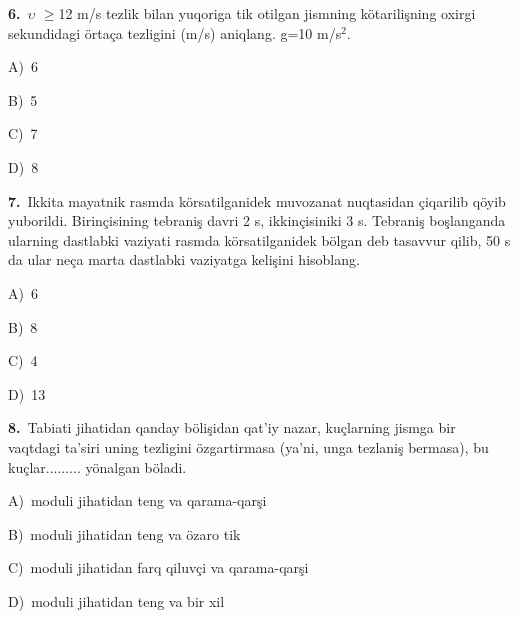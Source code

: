 \documentclass[11pt,a4paper]{article}
\newcommand{\opt}[2]{\hspace*{4mm}#1)\ #2\par}
\begin{document}
\noindent\begin{minipage}{\linewidth}
\textbf{6.}\ $\upsilon$ $\ge$12 m/s tezlik bilan yuqoriga tik otilgan jismning kötarilişning oxirgi sekundidagi örtaça tezligini (m/s) aniqlang. g=10 m/s$^{2}$.\par\smallskip
\opt{A}{6}
\opt{B}{5}
\opt{C}{7}
\opt{D}{8}
\end{minipage}\vspace{9pt}\par
\noindent\begin{minipage}{\linewidth}
\textbf{7.}\ Ikkita mayatnik rasmda körsatilganidek muvozanat nuqtasidan çiqarilib qöyib yuborildi. Birinçisining tebraniş davri 2 s, ikkinçisiniki 3 s. Tebraniş boşlanganda ularning dastlabki vaziyati rasmda körsatilganidek bölgan deb tasavvur qilib, 50 s da ular neça marta dastlabki vaziyatga kelişini hisoblang.\par\smallskip
\noindent\hspace*{4mm}\par\smallskip
\opt{A}{6}
\opt{B}{8}
\opt{C}{4}
\opt{D}{13}
\end{minipage}\vspace{9pt}\par
\noindent\begin{minipage}{\linewidth}
\textbf{8.}\ Tabiati jihatidan qanday bölişidan qat’iy nazar, kuçlarning jismga bir vaqtdagi ta’siri uning tezligini özgartirmasa (ya’ni, unga tezlaniş bermasa), bu kuçlar......... yönalgan böladi.\par\smallskip
\opt{A}{moduli jihatidan teng va qarama-qarşi}
\opt{B}{moduli jihatidan teng va özaro tik}
\opt{C}{moduli jihatidan farq qiluvçi va qarama-qarşi}
\opt{D}{moduli jihatidan teng va bir xil}
\end{minipage}\vspace{9pt}\par
\end{document}
